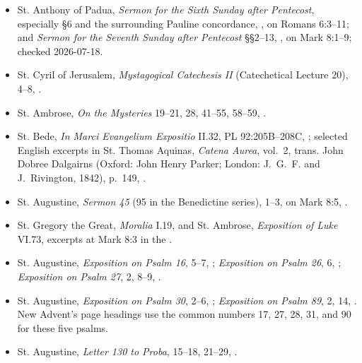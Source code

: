 {\begin{itemize}[itemsep=0em,topsep=0.15em,parsep=0pt]
\item St. Anthony of Padua, \emph{Sermon for the Sixth Sunday after Pentecost}, especially §6 and the surrounding Pauline concordance, , on Romans 6:3--11; and \emph{Sermon for the Seventh Sunday after Pentecost} §§2--13, , on Mark 8:1--9; checked 2026-07-18.
\item St. Cyril of Jerusalem, \emph{Mystagogical Catechesis II} (Catechetical Lecture 20), 4--8, .
\item St. Ambrose, \emph{On the Mysteries} 19--21, 28, 41--55, 58--59, .
\item St. Bede, \emph{In Marci Evangelium Expositio} II.32, PL 92:205B--208C, ; selected English excerpts in St. Thomas Aquinas, \emph{Catena Aurea}, vol.~2, trans. John Dobree Dalgairns (Oxford: John Henry Parker; London: J.~G.~F. and J.~Rivington, 1842), p.~149, .
\item St. Augustine, \emph{Sermon 45} (95 in the Benedictine series), 1--3, on Mark 8:5, .
\item St. Gregory the Great, \emph{Moralia} I.19, and St. Ambrose, \emph{Exposition of Luke} VI.73, excerpts at Mark 8:3 in the .
\item St. Augustine, \emph{Exposition on Psalm 16}, 5--7, ; \emph{Exposition on Psalm 26}, 6, ; \emph{Exposition on Psalm 27}, 2, 8--9, .
\item St. Augustine, \emph{Exposition on Psalm 30}, 2--6, ; \emph{Exposition on Psalm 89}, 2, 14, . New Advent's page headings use the common numbers 17, 27, 28, 31, and 90 for these five psalms.
\item St. Augustine, \emph{Letter 130 to Proba}, 15--18, 21--29, .
\end{itemize}
}

